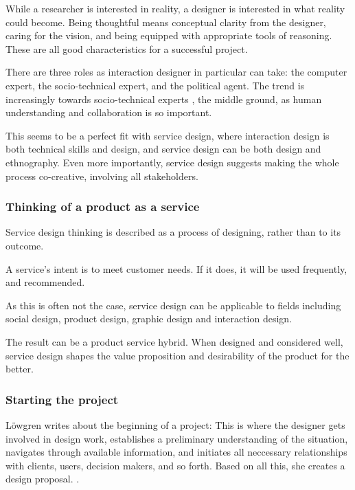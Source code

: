 While a researcher is interested in reality, a designer is interested in what reality could become. \citep{lowgren} Being thoughtful means conceptual clarity from the designer, caring for the vision, and being equipped with appropriate tools of reasoning. These are all good characteristics for a successful project.

There are three roles as interaction designer in particular can take: the computer expert, the socio-technical expert, and the political agent. The trend is increasingly towards socio-technical experts \citep{lowgren}, the middle ground, as human understanding and collaboration is so important.

This seems to be a perfect fit with service design, where interaction design is both technical skills and design, and service design can be both design and ethnography. Even more importantly, service design suggests making the whole process co-creative, involving all stakeholders. \citep{stickdorn}

\subsubsection{Thinking of a product as a service}

Service design thinking is described as a process of designing, rather than to its outcome.

A service's intent is to meet customer needs. If it does, it will be used frequently, and recommended. \citep{stickdorn}

As this is often not the case, service design can be applicable to fields including social design, product design, graphic design and interaction design.

The result can be a product service hybrid. When designed and considered well, service design shapes the value proposition and desirability of the product for the better.

\subsubsection{Starting the project}

Löwgren writes about the beginning of a project: This is where the designer gets involved in design work, establishes a preliminary understanding of the situation, navigates through available information, and initiates all neccessary relationships with clients, users, decision makers, and so forth. Based on all this, she creates a design proposal. \citep{lowgren}.
